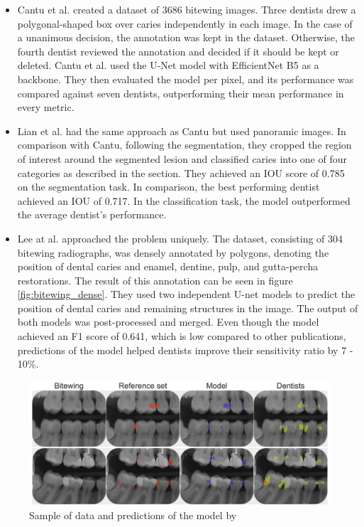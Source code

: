 \begin{itemize}
    \item{Cantu et al. \cite{Cantu2020}} created a dataset of 3686 bitewing images. Three dentists drew a polygonal-shaped box over caries independently in each image. In the case of a unanimous decision, the annotation was kept in the dataset. Otherwise, the fourth dentist reviewed the annotation and decided if it should be kept or deleted. Cantu et al. used the U-Net model with EfficientNet B5 as a backbone. They then  evaluated the model per pixel, and its performance was compared against seven dentists, outperforming their mean performance in every metric.
    \item{Lian et al. \cite{Lian2021}} had the same approach as Cantu but  used panoramic images. In comparison with Cantu, following the segmentation, they cropped the region of interest around the segmented lesion and classified caries into one of four categories as described in the section. They achieved an IOU score of 0.785 on the segmentation task. In comparison, the best performing dentist achieved an IOU of 0.717. In the classification task, the model outperformed the average dentist's performance.
    \item {Lee at al. \cite{Lee2021}}  approached the problem uniquely. The dataset, consisting of 304 bitewing radiographs, was densely annotated by polygons, denoting the position of dental caries and enamel, dentine, pulp, and gutta-percha restorations. The result of this annotation can be seen in figure \ref{fig:bitewing_dense}. They used two independent U-net models to predict the position of dental caries and remaining structures in the image. The output of both models was post-processed and merged. Even though the model achieved an F1 score of 0.641, which is low compared to other publications, predictions of the model helped dentists improve their sensitivity ratio by 7 - 10\%.
\end{itemize}

\begin{figure}
    \centering
    \includegraphics[width=\linewidth]{images/segmentatic_literature.png}
    \caption{Sample of data and predictions of the model by }
    \label{fig:segmentation_lit}
\end{figure}

